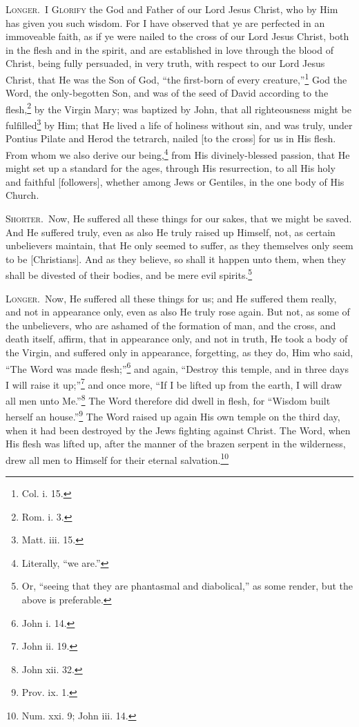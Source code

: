 \textsc{Longer.}~\textsc{I Glorify} the God and Father of our Lord Jesus Christ, who by Him has given you such wisdom. For I have observed that ye are perfected in an immoveable faith, as if ye were nailed to the cross of our Lord Jesus Christ, both in the flesh and in the spirit, and are established in love through the blood of Christ, being fully persuaded, in very truth, with respect to our Lord Jesus Christ, that He was the Son of God, “the first-born of every creature,”\footnote{Col. i. 15.} God the Word, the only-begotten Son, and was of the seed of David according to the flesh,\footnote{Rom. i. 3.} by the Virgin Mary; was baptized by John, that all righteousness might be fulfilled\footnote{Matt. iii. 15.} by Him; that He lived a life of holiness without sin, and was truly, under Pontius Pilate and Herod the tetrarch, nailed [to the cross] for us in His flesh. From whom we also derive our being,\footnote{Literally, “we are.”} from His divinely-blessed passion, that He might set up a standard for the ages, through His resurrection, to all His holy and faithful [followers], whether among Jews or Gentiles, in the one body of His Church.


\textsc{Shorter.}~Now, He suffered all these things for our sakes, that we might be saved. And He suffered truly, even as also He truly raised up Himself, not, as certain unbelievers maintain, that He only seemed to suffer, as they themselves only seem to be [Christians]. And as they believe, so shall it happen unto them, when they shall be divested of their bodies, and be mere evil spirits.\footnote{Or, “seeing that they are phantasmal and diabolical,” as some render, but the above is preferable.}

\textsc{Longer.}~Now, He suffered all these things for us; and He suffered them really, and not in appearance only, even as also He truly rose again. But not, as some of the unbelievers, who are ashamed of the formation of man, and the cross, and death itself, affirm, that in appearance only, and not in truth, He took a body of the Virgin, and suffered only in appearance, forgetting, as they do, Him who said, “The Word was made flesh;”\footnote{John i. 14.} and again, “Destroy this temple, and in three days I will raise it up;”\footnote{John ii. 19.} and once more, “If I be lifted up from the earth, I will draw all men unto Me.”\footnote{John xii. 32.} The Word therefore did dwell in flesh, for “Wisdom built herself an house.”\footnote{Prov. ix. 1.} The Word raised up again His own temple on the third day, when it had been destroyed by the Jews fighting against Christ. The Word, when His flesh was lifted up, after the manner of the brazen serpent in the wilderness, drew all men to Himself for their eternal salvation.\footnote{Num. xxi. 9; John iii. 14.}

